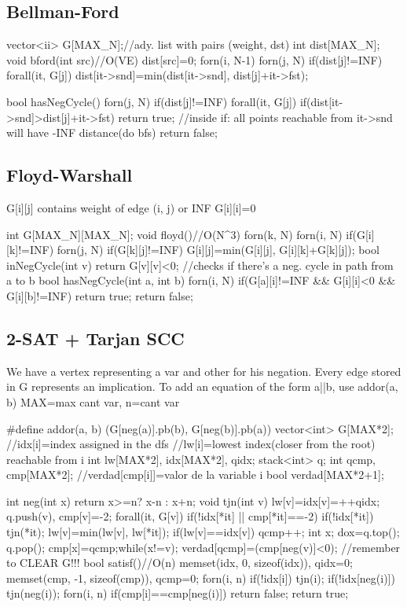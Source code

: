 \documentclass[10pt,landscape,twocolumn,a4paper,notitlepage]{article}
\begin{document}
\subsection{Bellman-Ford}
\begin{code}
vector<ii> G[MAX_N];//ady. list with pairs (weight, dst)
int dist[MAX_N];
void bford(int src){//O(VE)
	dist[src]=0;
	forn(i, N-1) forn(j, N) if(dist[j]!=INF) forall(it, G[j])
		dist[it->snd]=min(dist[it->snd], dist[j]+it->fst);
}

bool hasNegCycle(){
	forn(j, N) if(dist[j]!=INF) forall(it, G[j])
		if(dist[it->snd]>dist[j]+it->fst) return true;
	//inside if: all points reachable from it->snd will have -INF distance(do bfs)
	return false;
}
\end{code}
\subsection{Floyd-Warshall}
G[i][j] contains weight of edge (i, j) or INF
G[i][i]=0
\begin{code}
int G[MAX_N][MAX_N];
void floyd(){//O(N^3)
forn(k, N) forn(i, N) if(G[i][k]!=INF) forn(j, N) if(G[k][j]!=INF)
	G[i][j]=min(G[i][j], G[i][k]+G[k][j]);
}
bool inNegCycle(int v){
	return G[v][v]<0;}
//checks if there's a neg. cycle in path from a to b
bool hasNegCycle(int a, int b){
	forn(i, N) if(G[a][i]!=INF && G[i][i]<0 && G[i][b]!=INF)
		return true;
	return false;
}
\end{code}
\subsection{2-SAT + Tarjan SCC}
We have a vertex representing a var and other for his negation.
Every edge stored in G represents an implication. To add an equation of the form a||b, use addor(a, b)
MAX=max cant var, n=cant var
\begin{code}
#define addor(a, b) (G[neg(a)].pb(b), G[neg(b)].pb(a)) 
vector<int> G[MAX*2];
//idx[i]=index assigned in the dfs
//lw[i]=lowest index(closer from the root) reachable from i
int lw[MAX*2], idx[MAX*2], qidx;
stack<int> q;
int qcmp, cmp[MAX*2];
//verdad[cmp[i]]=valor de la variable i
bool verdad[MAX*2+1];

int neg(int x) { return x>=n? x-n : x+n;}
void tjn(int v){
	lw[v]=idx[v]=++qidx;
	q.push(v), cmp[v]=-2;
	forall(it, G[v]){
		if(!idx[*it] || cmp[*it]==-2){
			if(!idx[*it]) tjn(*it);
			lw[v]=min(lw[v], lw[*it]);
		}
	}
	if(lw[v]==idx[v]){
		qcmp++;
		int x;
		do{x=q.top(); q.pop(); cmp[x]=qcmp;}while(x!=v);
		verdad[qcmp]=(cmp[neg(v)]<0);
	}
}
//remember to CLEAR G!!!
bool satisf(){//O(n)
	memset(idx, 0, sizeof(idx)), qidx=0;
	memset(cmp, -1, sizeof(cmp)), qcmp=0;
	forn(i, n){
		if(!idx[i]) tjn(i);
		if(!idx[neg(i)]) tjn(neg(i));
	}
	forn(i, n) if(cmp[i]==cmp[neg(i)]) return false;
	return true;
}
\end{code}
\end{document}
